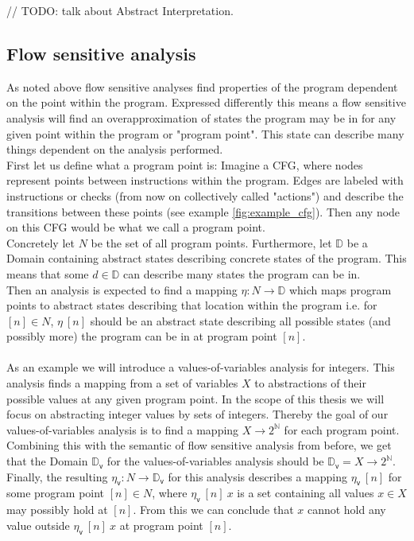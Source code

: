     // TODO: talk about Abstract Interpretation.
  
    \subsection{Flow sensitive analysis}
    As noted above flow sensitive analyses find properties of the program dependent on the point within the program. Expressed differently this means a flow sensitive analysis will find an overapproximation of states the program may be in for any given point within the program or "program point". This state can describe many things dependent on the analysis performed.\\
    First let us define what a program point is: Imagine a \ac{CFG}, where nodes represent points between instructions within the program. Edges are labeled with instructions or checks (from now on collectively called "actions") and describe the transitions between these points (see example \autoref{fig:example_cfg}). Then any node on this \ac{CFG} would be what we call a program point.\\
    Concretely let $N$ be the set of all program points. Furthermore, let $\mathbb{D}$ be a Domain containing abstract states describing concrete states of the program. This means that some $d \in \mathbb{D}$ can describe many states the program can be in.\\ 
    Then an analysis is expected to find a mapping $\eta: N \rightarrow \mathbb{D}$ which maps program points to abstract states describing that location within the program i.e. for $[n] \in N$, $\eta\ [n]$ should be an abstract state describing all possible states (and possibly more) the program can be in at program point $[n]$.\\
    \\
    As an example we will introduce a values-of-variables analysis for integers. This analysis finds a mapping from a set of variables $X$ to abstractions of their possible values at any given program point. In the scope of this thesis we will focus on abstracting integer values by sets of integers. Thereby the goal of our values-of-variables analysis is to find a mapping $X \rightarrow 2^\mathbb{N}$ for each program point.\\
    Combining this with the semantic of flow sensitive analysis from before, we get that the Domain $\mathbb{D}_\textsf{v}$ for the values-of-variables analysis should be $\mathbb{D}_\textsf{v} = X \rightarrow 2^\mathbb{N}$. Finally, the resulting $\eta_\textsf{v}: N \rightarrow \mathbb{D}_\textsf{v}$ for this analysis describes a mapping $\eta_\textsf{v}\ [n]$ for some program point $[n] \in N$, where $\eta_\textsf{v}\ [n]\ x$ is a set containing all values $x \in X$ may possibly hold at $[n]$. From this we can conclude that $x$ cannot hold any value outside $\eta_\textsf{v}\ [n]\ x$ at program point $[n]$.

